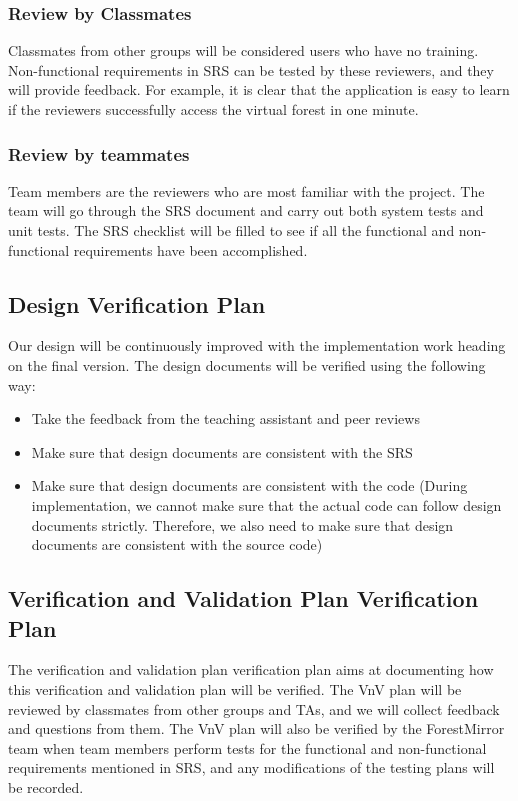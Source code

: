 \documentclass[12pt, titlepage]{article}
\begin{document}
\subsubsection{Review by Classmates}
Classmates from other groups will be considered users who have no 
training. Non-functional requirements in SRS can be tested by 
these reviewers, and they will provide feedback. For example, it 
is clear that the application is easy to learn if the reviewers 
successfully access the virtual forest in one minute.

\subsubsection{Review by teammates}
Team members are the reviewers who are most familiar with the 
project. The team will
go through the SRS document and carry out both system tests and 
unit tests. 
The SRS checklist will be filled to see if all the functional and
non-functional requirements have been accomplished.

\subsection{Design Verification Plan}
Our design will be continuously improved with the implementation
work heading on the final version. The design documents will be
verified using the following way:
\begin{itemize}
\item Take the feedback from the teaching assistant and peer
reviews 
\item Make sure that design documents are consistent with the 
SRS
\item Make sure that design documents are consistent with the code
(During implementation, we cannot make sure that the actual code 
can follow design documents strictly. Therefore, we also 
need to make sure that design documents are consistent with 
the source code)
\end{itemize}

\subsection{Verification and Validation Plan Verification Plan}
The verification and validation plan verification plan aims at 
documenting how this verification and validation plan will be 
verified. The VnV plan will be reviewed by classmates from other 
groups and TAs, and we will collect feedback and questions from 
them. The VnV plan will also be verified by the ForestMirror team 
when team members perform tests for the functional and 
non-functional requirements mentioned in SRS, and any 
modifications of the testing plans will be recorded. 
\end{document}
